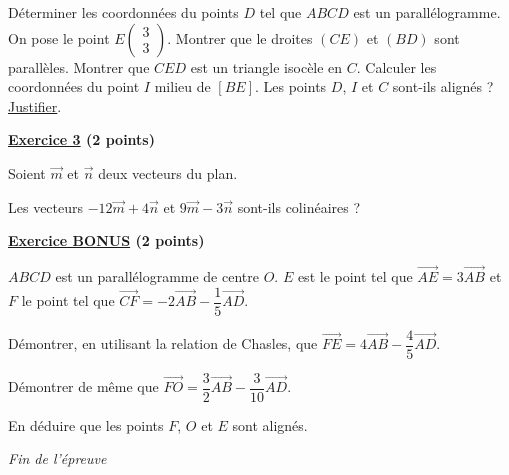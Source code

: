 \documentclass[12pt,a4paper]{exam}
\newcommand*{\Coord}[2]{%
  \ensuremath{
    \begin{pmatrix} 
      #1\\[5pt]
      #2 
    \end{pmatrix}}}
\begin{document}
\begin{questions}
    \question[2] Déterminer les coordonnées du points $D$ tel que $ABCD$ est un parallélogramme.
    \question[2] On pose le point $E\Coord{3}{3}$. Montrer que le droites $(CE)$ et $(BD)$ sont parallèles.
    \question[2] Montrer que $CED$ est un triangle isocèle en $C$.
    \question[1] Calculer les coordonnées du point $I$ milieu de $[BE]$.
    \question[2] Les points $D$, $I$ et $C$ sont-ils alignés ? \underline{Justifier}.
\end{questions}

\vspace{1cm}

\noindent
\textbf{\underline{Exercice 3} (2 points)}

\vspace{5pt}
Soient $\vec{m}$ et $\overrightarrow{n}$ deux vecteurs du plan.

\begin{questions}

\question[2] Les vecteurs $-12\overrightarrow{m}+4\overrightarrow{n}$ et $9\overrightarrow{m}-3\overrightarrow{n}$ sont-ils 
colinéaires ?

\end{questions}

\vspace{1cm}

\textbf{\underline{Exercice BONUS} (2 points)}

$ABCD$ est un parallélogramme de centre $O$. $E$ est le point tel que $\overrightarrow{AE} = 3 
\overrightarrow{AB}$ et $F$ le point tel que $\overrightarrow{CF} = -2 \overrightarrow{AB} - 
\dfrac{1}{5}\overrightarrow{AD}$.

\begin{questions}
    \question[1] Démontrer, en utilisant la relation de Chasles, que $\overrightarrow{FE} = 
    4 \overrightarrow{AB} - \dfrac{4}{5}\overrightarrow{AD}$.

    \question[1] Démontrer de même que $\overrightarrow{FO} = \dfrac{3}{2}\overrightarrow{AB} - 
    \dfrac{3}{10}\overrightarrow{AD}$.

    \question[1] En déduire que les points $F$, $O$ et $E$ sont alignés.
\end{questions}




\vspace{0.5cm}

\begin{center}
    \textit{Fin de l'épreuve}
\end{center}
\end{document}
